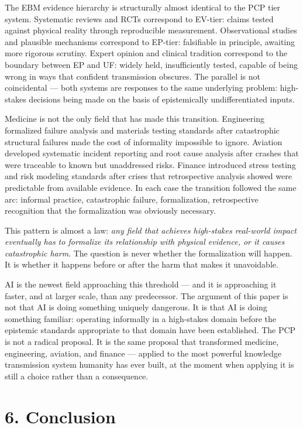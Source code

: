 \documentclass[
]{article}
\begin{document}
The EBM evidence hierarchy is structurally almost identical to the PCP
tier system. Systematic reviews and RCTs correspond to EV-tier: claims
tested against physical reality through reproducible measurement.
Observational studies and plausible mechanisms correspond to EP-tier:
falsifiable in principle, awaiting more rigorous scrutiny. Expert
opinion and clinical tradition correspond to the boundary between EP and
UF: widely held, insufficiently tested, capable of being wrong in ways
that confident transmission obscures. The parallel is not coincidental
--- both systems are responses to the same underlying problem:
high-stakes decisions being made on the basis of epistemically
undifferentiated inputs.

Medicine is not the only field that has made this transition.
Engineering formalized failure analysis and materials testing standards
after catastrophic structural failures made the cost of informality
impossible to ignore. Aviation developed systematic incident reporting
and root cause analysis after crashes that were traceable to known but
unaddressed risks. Finance introduced stress testing and risk modeling
standards after crises that retrospective analysis showed were
predictable from available evidence. In each case the transition
followed the same arc: informal practice, catastrophic failure,
formalization, retrospective recognition that the formalization was
obviously necessary.

This pattern is almost a law: \emph{any field that achieves high-stakes
real-world impact eventually has to formalize its relationship with
physical evidence, or it causes catastrophic harm}. The question is
never whether the formalization will happen. It is whether it happens
before or after the harm that makes it unavoidable.

AI is the newest field approaching this threshold --- and it is
approaching it faster, and at larger scale, than any predecessor. The
argument of this paper is not that AI is doing something uniquely
dangerous. It is that AI is doing something familiar: operating
informally in a high-stakes domain before the epistemic standards
appropriate to that domain have been established. The PCP is not a
radical proposal. It is the same proposal that transformed medicine,
engineering, aviation, and finance --- applied to the most powerful
knowledge transmission system humanity has ever built, at the moment
when applying it is still a choice rather than a consequence.

\section{\texorpdfstring{\textbf{6.
Conclusion}}{6. Conclusion}}\label{conclusion}
\end{document}
